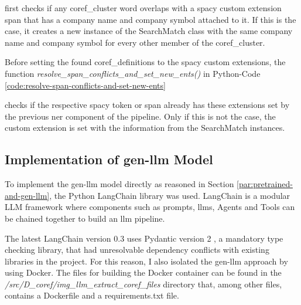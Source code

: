 first checks if any \gls{coref_cluster} word overlaps with a spacy custom extension \gls{span} that has a company name and company symbol attached to it.
If this is the case, it creates a new instance of the SearchMatch class with the same company name and company symbol for every other member of the \gls{coref_cluster}.

Before setting the found \glspl{coref_definition} to the spacy custom extensions, the function \emph{resolve\_span\_conflicts\_and\_set\_new\_ents()} in Python-Code \ref{code:resolve-span-conflicts-and-set-new-ents}

checks if the respective spacy \gls{token} or \gls{span} already has these extensions set by the previous \gls{ner} component of the pipeline.
Only if this is not the case, the custom extension is set with the information from the SearchMatch instances.

\subsection{Implementation of \gls{gen-llm} Model}\label{subsec:langchain-explain}
To implement the \gls{gen-llm} model directly as reasoned in Section \ref{par:pretrained-and-gen-llm}, the Python LangChain \cite{LangChain} library was used.
LangChain is a modular LLM framework where components such as \glspl{prompt}, \glspl{llm}, Agents and Tools can be chained together to build an \gls{llm} pipeline.

The latest LangChain version 0.3 uses Pydantic version 2 \cite{Pydantic}, a mandatory type checking library, that had unresolvable dependency conflicts with existing libraries in the project.
For this reason, I also isolated the \gls{gen-llm} approach by using Docker.
The files for building the Docker container can be found in the \emph{/src/D\_coref/img\_llm\_extract\_coref\_files} directory that, among other files, contains a Dockerfile and a requirements.txt file.

